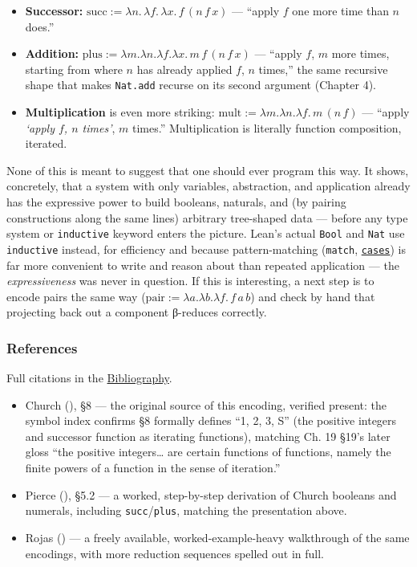 \begin{itemize}
\tightlist
\item
  \textbf{Successor:} \(\mathrm{succ} := \lambda n.\, \lambda f.\, \lambda x.\,
  f\,(n\, f\, x)\) --- ``apply \(f\) one more time than \(n\) does.''
\item
  \textbf{Addition:} \(\mathrm{plus} := \lambda m.\lambda n.\lambda f.\lambda x.\,
  m\, f\,(n\, f\, x)\) --- ``apply \(f\), \(m\) more times, starting from where \(n\) has already applied \(f\), \(n\) times,'' the same recursive shape that makes \texttt{Nat.add} recurse on its second argument (Chapter 4).
\item
  \textbf{Multiplication} is even more striking: \(\mathrm{mult} := \lambda m.
  \lambda n.\lambda f.\, m\,(n\, f)\) --- ``apply \emph{`apply \(f\), \(n\) times'}, \(m\) times.'' Multiplication is literally function composition, iterated.
\end{itemize}

None of this is meant to suggest that one should ever program this way. It shows, concretely, that a system with only variables, abstraction, and application already has the expressive power to build booleans, naturals, and (by pairing constructions along the same lines) arbitrary tree-shaped data --- before any type system or \texttt{inductive} keyword enters the picture. Lean's actual \texttt{Bool} and \texttt{Nat} use \texttt{inductive} instead, for efficiency and because pattern-matching (\texttt{match}, \href{https://lean-lang.org/doc/reference/latest/Tactic-Proofs/Tactic-Reference/}{\texttt{cases}}) is far more convenient to write and reason about than repeated application --- the \emph{expressiveness} was never in question. If this is interesting, a next step is to encode pairs the same way (\(\mathrm{pair} := \lambda a.\lambda b.\lambda f.\,
f\, a\, b\)) and check by hand that projecting back out a component β-reduces correctly.

\subsubsection{References}\label{sec:13-next-steps:03-next-projects:8}

Full citations in the \hyperref[sec:root:bibliography:1]{Bibliography}.

\begin{itemize}
\tightlist
\item
  Church (\cite{Church1941}), §8 --- the original source of this encoding, verified present: the symbol index confirms §8 formally defines ``1, 2, 3, S'' (the positive integers and successor function as iterating functions), matching Ch. 19 §19's later gloss ``the positive integers\ldots{} are certain functions of functions, namely the finite powers of a function in the sense of iteration.''
\item
  Pierce (\cite{Pierce2002}), §5.2 --- a worked, step-by-step derivation of Church booleans and numerals, including \texttt{succ}/\texttt{plus}, matching the presentation above.
\item
  Rojas (\cite{Rojas2015}) --- a freely available, worked-example-heavy walkthrough of the same encodings, with more reduction sequences spelled out in full.
\end{itemize}

